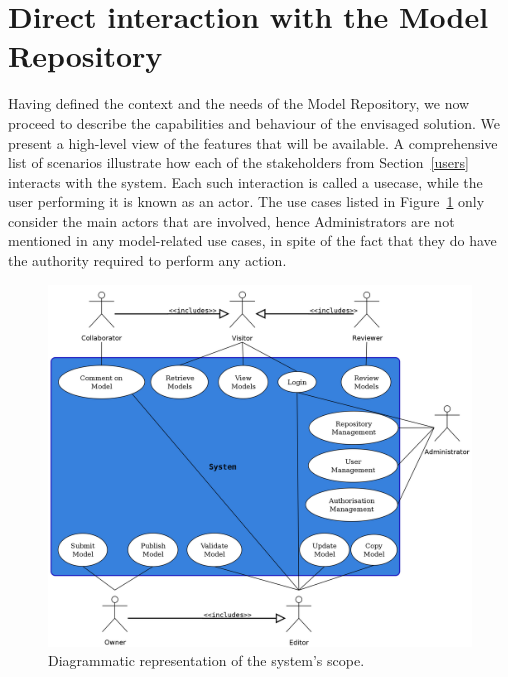 \section{Direct interaction with the \ddmore Model Repository}
\label{directInteraction}
Having defined the context and the needs of the \ddmore Model Repository, we now proceed to describe the capabilities and behaviour of the envisaged solution. We present a high-level view of the features that will be available. A comprehensive list of scenarios 
illustrate how each of the stakeholders from Section~\ref{users} interacts with the system. Each such interaction is called a \gls{usecase}, while the user performing it is known as an \gls{actor}. The use cases listed in Figure~\ref{fig:useCases} only consider the main actors that are involved, hence Administrators are not mentioned in any model-related use cases, in spite of the fact that they do have the authority required to perform any action.

\begin{figure}[htb]
\centering
\includegraphics{img/UseCases}
\caption{Diagrammatic representation of the system's scope.}
\label{fig:useCases}
\end{figure}

